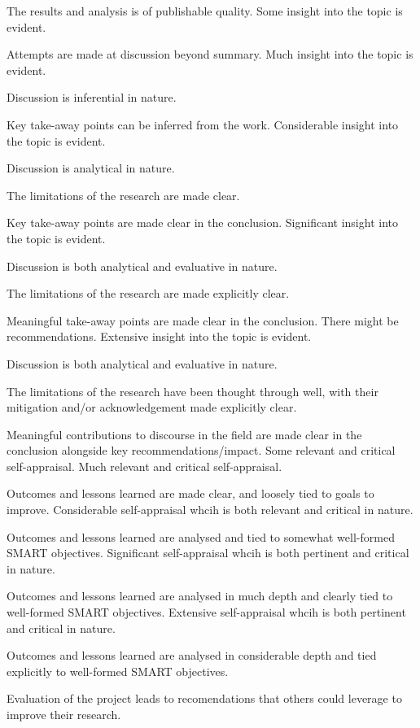 \documentclass{../fal_assignment}
\begin{document}
\begin{markingrubric}
        \par		The results and analysis is of publishable quality.
        \grade\fail 
        \grade		Some insight into the topic is evident.
        \par		Attempts are made at discussion beyond summary.
        \grade		Much insight into the topic is evident.
        \par		Discussion is inferential in nature.
        \par		Key take-away points can be inferred from the work.
        \grade		Considerable insight into the topic is evident.
        \par		Discussion is analytical in nature.
        \par		The limitations of the research are made clear.
        \par		Key take-away points are made clear in the conclusion.
        \grade		Significant  insight into the topic is evident.
        \par		Discussion is both analytical and evaluative in nature.
        \par		The limitations of the research are made explicitly clear.
        \par		Meaningful take-away points are made clear in the conclusion. There might be recommendations.
        \grade		Extensive insight into the topic is evident.
        \par		Discussion is both analytical and evaluative in nature.
        \par		The limitations of the research have been thought through well, with their mitigation and/or acknowledgement made explicitly clear.
        \par		Meaningful contributions to discourse in the field are made clear in the conclusion alongside key recommendations/impact.
        \grade\fail 
        \grade		Some relevant and critical self-appraisal.
        \grade		Much relevant and critical self-appraisal.
        \par		Outcomes and lessons learned are made clear, and loosely tied to goals to improve.
        \grade		Considerable self-appraisal whcih is both relevant and critical in nature.
        \par		Outcomes and lessons learned are analysed and tied to somewhat well-formed SMART objectives.
        \grade		Significant self-appraisal whcih is both pertinent and critical in nature.
        \par		Outcomes and lessons learned are analysed in much depth and clearly tied to well-formed SMART objectives.
        \grade		Extensive self-appraisal whcih is both pertinent and critical in nature.
        \par		Outcomes and lessons learned are analysed in considerable depth and tied explicitly to well-formed SMART objectives. 
       \par		Evaluation of the project leads to recomendations that others could leverage to improve their research. 
\end{markingrubric}
\end{document}

